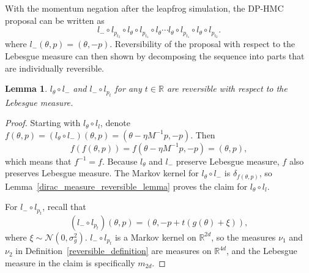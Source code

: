 \documentclass[english,twoside,openright]{HYgraduMLDS}
\newtheorem{lemma}{Lemma}[chapter]
\newcommand{\R}{\mathbb{R}}
\newcommand{\caln}{{\mathcal{N}}}
\begin{document}
With the momentum negation after the leapfrog simulation, the DP-HMC proposal
can be written as
\[
  l_{-}\circ l_{p_{t_{2}}}\circ l_{\theta}\circ l_{p_{t_{1}}}\circ l_{\theta}\dotsb
  l_{\theta}\circ l_{p_{t_{1}}}\circ l_{\theta}\circ l_{p_{t_{2}}}.
\]
where \(l_{-}(\theta, p) = (\theta, -p)\). Reversibility of the proposal
with respect to the Lebesgue measure can then shown by
decomposing the sequence into parts that are individually reversible.

\begin{lemma}\label{leapfrog_step_reversible_lemma}
  \(l_{\theta}\circ l_{-}\) and \(l_{-}\circ l_{p_{t}}\) for any \(t\in \R\)
  are reversible with respect to the Lebesgue measure.
\end{lemma}
\begin{proof}
  Starting with \(l_{\theta}\circ l_{l}\), denote
  \(f(\theta, p) = (l_{\theta}\circ l_{-})(\theta, p)
  = (\theta - \eta M^{-1}p, -p)\). Then
  \[
    f(f(\theta, p)) = f(\theta - \eta M^{-1}p, -p) = (\theta, p),
  \]
  which means that \(f^{-1} = f\). Because \(l_{\theta}\) and \(l_{-}\) preserve
  Lebesgue measure, \(f\) also preserves Lebesgue measure.
  The Markov kernel for \(l_{\theta}\circ l_{-}\) is \(\delta_{f(\theta, p)}\),
  so Lemma~\ref{dirac_measure_reversible_lemma} proves the claim for
  \(l_{\theta}\circ l_{l}\).

  For \(l_{-}\circ l_{p_{t}}\), recall that
  \[
    (l_{-}\circ l_{p_{t}})(\theta, p) = (\theta, -p + t(g(\theta) + \xi)),
  \]
  where \(\xi \sim \caln(0, \sigma_{g}^{2})\).
  \(l_{-}\circ l_{p_{t}}\) is a Markov kernel on \(\R^{2d}\),
  so the measures \(\nu_{1}\) and \(\nu_{2}\) in
  Definition~\ref{reversible_definition} are measures on \(\R^{4d}\), and
  the Lebesgue measure in the claim is specifically \(m_{2d}\).


\end{proof}
\end{document}
